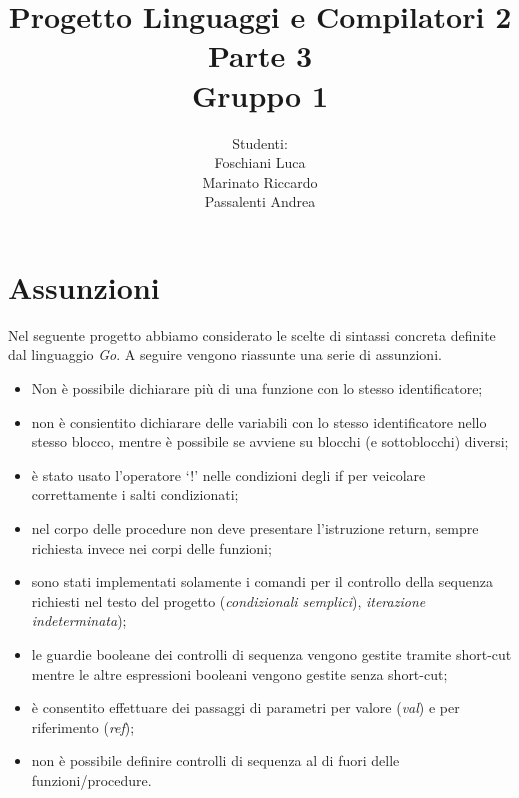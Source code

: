 \documentclass[12pt]{article}
\begin{document}
\title{\noindent \Huge Progetto Linguaggi e Compilatori 2\\ Parte 3 \\ Gruppo 1}
\date{}
\author{Studenti: \\Foschiani Luca\\ Marinato Riccardo \\Passalenti Andrea}

\maketitle
\newpage

\section{Assunzioni}
Nel seguente progetto abbiamo considerato le scelte di sintassi concreta definite dal linguaggio \textit{Go}.
A seguire vengono riassunte una serie di assunzioni.

\begin{itemize}
\item Non è possibile dichiarare più di una funzione con lo stesso identificatore;
\item non è consientito dichiarare delle variabili con lo stesso identificatore nello stesso blocco, mentre è possibile se avviene su blocchi (e sottoblocchi) diversi;
\item è stato usato l'operatore `!' nelle condizioni degli if per veicolare correttamente i salti condizionati;
\item nel corpo delle procedure non deve presentare l'istruzione return, sempre richiesta invece nei corpi delle funzioni;
\item sono stati implementati solamente i comandi per il controllo della sequenza richiesti nel testo del progetto (\textit{condizionali semplici}), \textit{iterazione indeterminata});
\item le guardie booleane dei controlli di sequenza vengono gestite tramite short-cut mentre le altre espressioni booleani vengono gestite senza short-cut;
\item è consentito effettuare dei passaggi di parametri per valore (\textit{val}) e per riferimento (\textit{ref});
\item non è possibile definire controlli di sequenza al di fuori delle funzioni/procedure.
\end{itemize}
\end{document}
